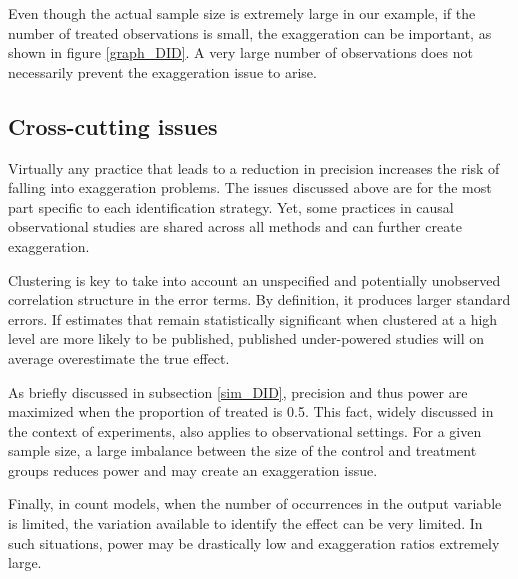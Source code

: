 \documentclass[12pt]{article}
\begin{document}
		Even though the actual sample size is extremely large in our example, if the number of treated observations is small, the exaggeration can be important, as shown in figure \ref{graph_DID}. A very large number of observations does not necessarily prevent the exaggeration issue to arise.
		
	\subsection{Cross-cutting issues}
     
     Virtually any practice that leads to a reduction in precision increases the risk of falling into exaggeration problems. The issues discussed above are for the most part specific to each identification strategy. Yet, some practices in causal observational studies are shared across all methods and can further create exaggeration.
       
     Clustering is key to take into account an unspecified and potentially unobserved correlation structure in the error terms. 
     By definition, it produces larger standard errors. If estimates that remain statistically significant when clustered at a high level are more likely to be published, published under-powered studies will on average overestimate the true effect. 
        
     As briefly discussed in subsection \ref{sim_DID}, precision and thus power are maximized when the proportion of treated is 0.5. This fact, widely discussed in the context of experiments, also applies to observational settings. For a given sample size, a large imbalance between the size of the control and treatment groups reduces power and may create an exaggeration issue.
        
     Finally, in count models, when the number of occurrences in the output variable is limited, the variation available to identify the effect can be very limited. In such situations, power may be drastically low and exaggeration ratios extremely large.
		
		

\end{document}
